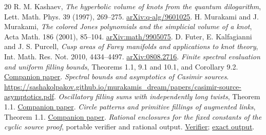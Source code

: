\documentclass[11pt]{article}
\numberwithin{equation}{section}
\begin{document}
\begin{thebibliography}{20}
 R. M. Kashaev, \emph{The hyperbolic volume of knots
from the quantum dilogarithm}, Lett. Math. Phys. 39 (1997), 269--275.
\href{https://arxiv.org/abs/q-alg/9601025}{arXiv:q-alg/9601025}.
 H. Murakami and J. Murakami, \emph{The colored
Jones polynomials and the simplicial volume of a knot}, Acta Math.
186 (2001), 85--104. \href{https://arxiv.org/abs/math/9905075}{arXiv:math/9905075}.
 D. Futer, E. Kalfagianni and J. S. Purcell,
\emph{Cusp areas of Farey manifolds and applications to knot theory},
Int. Math. Res. Not. 2010, 4434--4497.
\href{https://arxiv.org/abs/0808.2716}{arXiv:0808.2716}.
 \emph{Finite spectral evaluation and uniform filling
bounds}, Theorems 1.1, 9.1 and 10.1, and Corollary 9.2.
\href{https://sashakolpakov.github.io/murakamis_dream/papers/filling-bounds.pdf}{Companion paper}.
 \emph{Spectral bounds and asymptotics of Casimir sources}.
\url{https://sashakolpakov.github.io/murakamis_dream/papers/casimir-source-asymptotics.pdf}.
 \emph{Oscillatory filling sums with
independently long twists}, Theorem 1.1.
\href{https://sashakolpakov.github.io/murakamis_dream/papers/oscillatory-fillings.pdf}{Companion paper}.
 \emph{Circle patterns and primitive fillings
of augmented links}, Theorem 1.1.
\href{https://sashakolpakov.github.io/murakamis_dream/papers/marked-fillings.pdf}{Companion paper}.
 \emph{Rational enclosures for the fixed constants
of the cyclic source proof}, portable verifier and rational output.
\href{https://github.com/sashakolpakov/murakamis_dream/blob/main/repro/check_cyclic_source_constants.py}{Verifier};
\href{https://github.com/sashakolpakov/murakamis_dream/blob/main/repro/results/cyclic-source-constants.json}{exact output}.
\end{thebibliography}
\end{document}
